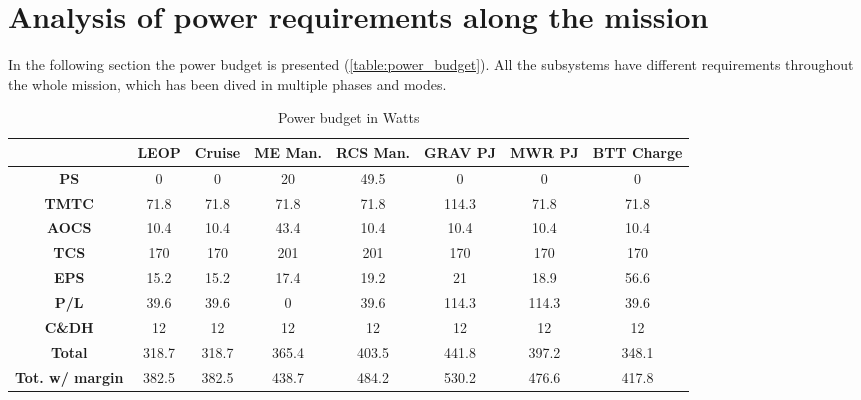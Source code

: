 \section{Analysis of power requirements along the mission}
\label{sec:EPS_phases}

In the following section the power budget is presented (\autoref{table:power_budget}). All the subsystems have different requirements throughout the whole mission, which has been dived in multiple phases and modes. 
\begin{table}[H]
    \renewcommand{\arraystretch}{1.5}
    \centering
    \begin{tabular}{|c|c|c|c|c|c|c|c|}
        \hline
        & \textbf{LEOP} & \textbf{Cruise} & \textbf{ME Man.} & \textbf{RCS Man.} & \textbf{GRAV PJ} & \textbf{MWR PJ} & \textbf{BTT Charge} \\
        \hline
        \hline
        \textbf{PS} & 0 & 0 & 20 & 49.5 & 0 & 0 & 0 \\
        \hline
        \textbf{TMTC} & 71.8 & 71.8 & 71.8 & 71.8 & 114.3 & 71.8 & 71.8 \\
        \hline
        \textbf{AOCS} & 10.4 & 10.4 & 43.4 & 10.4 & 10.4 & 10.4 & 10.4 \\
        \hline
        \textbf{TCS} & 170 & 170 & 201 & 201 & 170 & 170 & 170 \\
        \hline
        \textbf{EPS} & 15.2 & 15.2 & 17.4 & 19.2 & 21 & 18.9 & 56.6 \\
        \hline
        \textbf{P/L} & 39.6 & 39.6 & 0 & 39.6 & 114.3 & 114.3 & 39.6 \\
        \hline
        \textbf{C\&DH} & 12 & 12 & 12 & 12 & 12 & 12 & 12 \\
        \hline
        \hline
        \textbf{Total} & 318.7 & 318.7 & 365.4 & 403.5 & 441.8 & 397.2 & 348.1 \\
        \hline
        \textbf{Tot. w/ margin} & 382.5 & 382.5 & 438.7 & 484.2 & 530.2 & 476.6 & 417.8 \\
        \hline
    \end{tabular}
    \caption{Power budget in Watts}
    \label{table:power_budget}
\end{table}  

